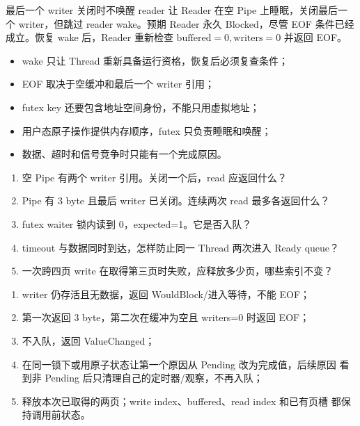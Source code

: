 \begin{faultinjectionbox}{最后一个 writer 关闭时不唤醒 reader}
让 Reader 在空 Pipe 上睡眠，关闭最后一个 writer，但跳过 reader wake。预期
Reader 永久 Blocked，尽管 EOF 条件已经成立。恢复 wake 后，Reader 重新检查
\(\text{buffered}=0,\text{writers}=0\) 并返回 EOF。
\end{faultinjectionbox}

\begin{pitfallbox}
\begin{itemize}[leftmargin=2.2em]
  \item wake 只让 Thread 重新具备运行资格，恢复后必须复查条件；
  \item EOF 取决于空缓冲和最后一个 writer 引用；
  \item futex key 还要包含地址空间身份，不能只用虚拟地址；
  \item 用户态原子操作提供内存顺序，futex 只负责睡眠和唤醒；
  \item 数据、超时和信号竞争时只能有一个完成原因。
\end{itemize}
\end{pitfallbox}


\begin{enumerate}[leftmargin=2.2em]
  \item 空 Pipe 有两个 writer 引用。关闭一个后，read 应返回什么？
  \item Pipe 有 3 byte 且最后 writer 已关闭。连续两次 read 最多各返回什么？
  \item futex waiter 锁内读到 0，expected=1。它是否入队？
  \item timeout 与数据同时到达，怎样防止同一 Thread 两次进入 Ready queue？
  \item 一次跨四页 write 在取得第三页时失败，应释放多少页，哪些索引不变？
\end{enumerate}

\begin{answerbox}
\begin{enumerate}[leftmargin=2.2em]
  \item writer 仍存活且无数据，返回 WouldBlock/进入等待，不能 EOF；
  \item 第一次返回 3 byte，第二次在缓冲为空且 writers=0 时返回 EOF；
  \item 不入队，返回 ValueChanged；
  \item 在同一锁下或用原子状态让第一个原因从 Pending 改为完成值，后续原因
    看到非 Pending 后只清理自己的定时器/观察，不再入队；
  \item 释放本次已取得的两页；write index、buffered、read index 和已有页槽
    都保持调用前状态。
\end{enumerate}
\end{answerbox}
